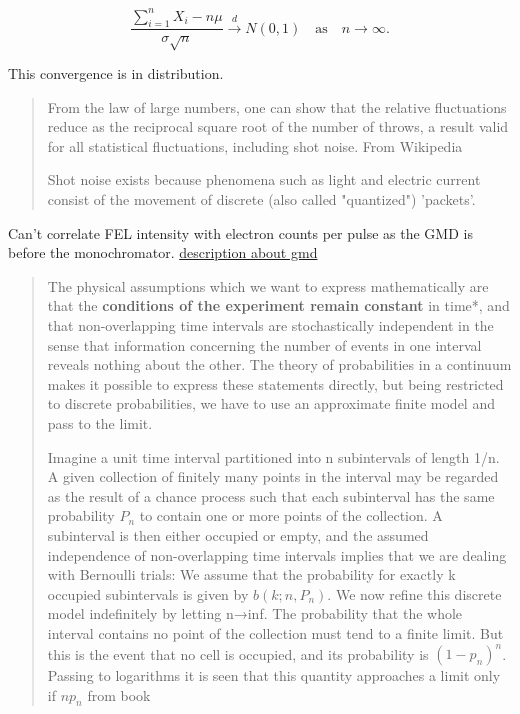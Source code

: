 \[
\frac{\sum_{i=1}^{n} X_i - n\mu}{\sigma \sqrt{n}} \xrightarrow{d} N(0, 1) \quad \text{as} \quad n \to \infty.
\]

This convergence is in distribution.
\begin{quotation}
    From the law of large numbers, one can show that the relative fluctuations reduce as the reciprocal square root of the number of throws, a result valid for all statistical fluctuations, including shot noise. From Wikipedia
    
    Shot noise exists because phenomena such as light and electric current consist of the movement of discrete (also called "quantized") 'packets'.
\end{quotation}

Can't correlate FEL intensity with electron counts per pulse as the GMD is before the monochromator.  \href{https://photon-science.desy.de/facilities/flash/photon_diagnostics/gmd_intensity_and_position/index_eng.html}{description about gmd}

\begin{quotation}
    The physical assumptions which we want to express mathematically are that the \textbf{conditions of the experiment remain constant} in time*, and that non-overlapping time intervals are stochastically independent in the sense that information concerning the number of events in one interval reveals nothing about the other. The theory of probabilities in a continuum makes it possible to express these statements directly, but being restricted to discrete probabilities, we have to use an approximate finite model and pass to the limit.

    Imagine a unit time interval partitioned into n subintervals of length 1/n. A given collection of finitely many points in the interval may be regarded as the result of a chance process such that each subinterval has the same probability $P_{n}$ to contain one or more points of the collection. A subinterval is then either occupied or empty, and the assumed independence of non-overlapping time intervals implies that we are dealing with Bernoulli trials: We assume that the probability for exactly k occupied subintervals is given by $b(k;n,P_{n})$. We now refine this discrete model indefinitely by letting n→inf. The probability that the whole interval contains no point of the collection must tend to a finite limit. But this is the event that no cell is occupied, and its probability is $(1-p_{n})^{n}$. Passing to logarithms it is seen that this quantity approaches a limit only if $np_{n}$
    from book \cite{fellerIntroductionProbabilityTheory1968}
\end{quotation}
